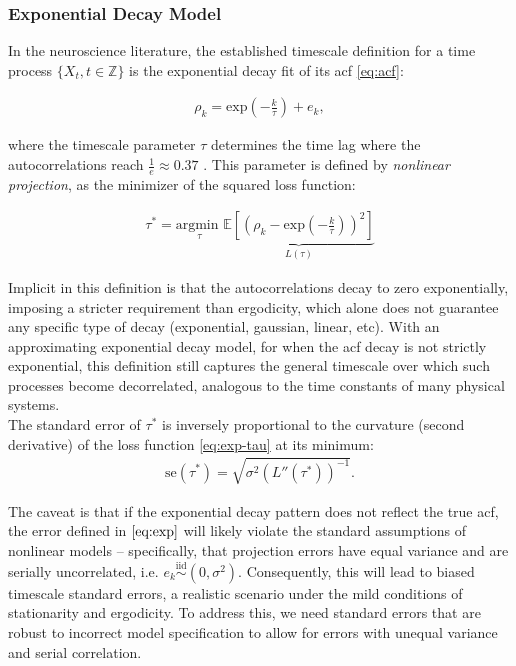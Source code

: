 \documentclass[main.tex]{subfiles}
\begin{document}
\subsubsection{Exponential Decay Model}

In the neuroscience literature, the established timescale definition for a time process $\{X_t, t\in \mathbb{Z}\}$ is the exponential decay fit of its acf \eqref{eq:acf}:

\begin{align}\label{eq:exp}
    \rho_k = \text{exp}(-\frac{k}{\tau}) + e_k,
\end{align}

where the timescale parameter $\tau$ determines the time lag where the autocorrelations reach $\frac{1}{e} \approx 0.37$ \cite{murray_hierarchy_2014}. This parameter is defined by \textit{nonlinear projection}, as the minimizer of the squared loss function:

\begin{align}\label{eq:exp-tau}
  \tau^* = \underset{\tau}{\text{argmin }} \underbrace{
  \mathbb{E}[(\rho_k - \text{exp}(-\frac{k}{\tau}))^2]}_{L(\tau)} 
\end{align}

Implicit in this definition is that the autocorrelations decay to zero exponentially, imposing a stricter requirement than ergodicity, which alone does not guarantee any specific type of decay (exponential, gaussian, linear, etc). With an approximating exponential decay model, for when the acf decay is not strictly exponential, this definition still captures the general timescale over which such processes become decorrelated, analogous to the time constants of many physical systems.\\


The standard error of $\tau^*$ is inversely proportional to the curvature (second derivative) of the loss function \eqref{eq:exp-tau} at its minimum:
\begin{align}
   \text{se}(\tau^*) = \sqrt{\sigma^2 (L''(\tau^*))^{-1}}. \label{eq:exp-se-tau}
\end{align}


The caveat is that if the exponential decay pattern does not reflect the true acf, the error defined in $\eqref{eq:exp}$ will likely violate the standard assumptions of nonlinear models -- specifically, that projection errors have equal variance and are serially uncorrelated, i.e. $e_k \overset{\text{iid}}{\sim} (0, \sigma^2)$. Consequently, this will lead to biased timescale standard errors, a realistic scenario under the mild conditions of stationarity and ergodicity. To address this, we need standard errors that are robust to incorrect model specification to allow for errors with unequal variance and serial correlation.
\end{document}
